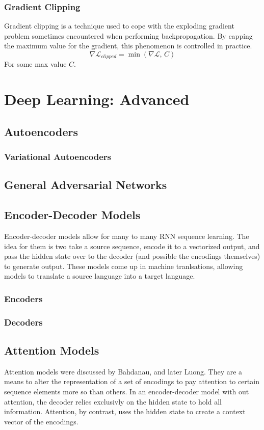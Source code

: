 \documentclass[twoside,twocolumn]{article}
\begin{document}
\subsubsection{Gradient Clipping}
Gradient clipping is a technique used to cope with the exploding gradient
problem sometimes encountered when performing backpropagation.
By capping the maximum value for the gradient, this phenomenon is
controlled in practice.
\begin{equation}
  \nabla \mathcal{L}_{clipped} = \min \left( \nabla \mathcal{L}, \, C  \right)
\end{equation}
For some max value $C$.
\section{Deep Learning: Advanced}
\subsection{Autoencoders}
\subsubsection{Variational Autoencoders}
\subsection{General Adversarial Networks}
\subsection{Encoder-Decoder Models}
Encoder-decoder models allow for many to many RNN sequence learning. The idea
for them is two take a source sequence, encode it to a vectorized output, and
pass the hidden state over to the decoder (and possible the encodings themselves)
to generate output. These models come up in machine tranlsations, allowing
models to translate a source language into a target language.
\subsubsection{Encoders}
\subsubsection{Decoders}
\subsection{Attention Models}
Attention models were discussed by Bahdanau, and later Luong. They are a means
to alter the representation of a set of encodings to pay attention to certain
sequence elements more so than others. In an encoder-decoder model with out
attention, the decoder relies exclusivly on the hidden state to hold all
information. Attention, by contrast, uses the hidden state to create a context
vector of the encodings.
\end{document}
